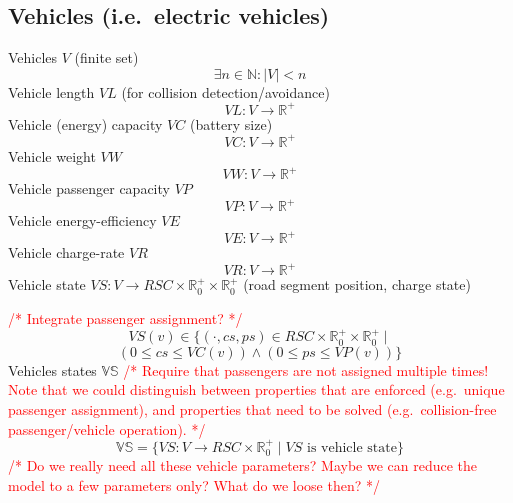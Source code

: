\documentclass[conference]{IEEEtran}
\newcommand{\todo}[1]{\textcolor{red}{/* #1 */}}
\begin{document}
%	
%	
	\subsection{Vehicles (i.e.\ electric vehicles)}
	\label{vehicles}
	
	Vehicles $V$ (finite set)
	\[
		\exists n \in \mathbb{N} : |V| < n
	\]
	Vehicle length $VL$ (for collision detection/avoidance)
	\[
		VL : V \rightarrow \mathbb{R}^+
	\]
	Vehicle (energy) capacity $VC$ (battery size)
	\[
		VC : V \rightarrow \mathbb{R}^+
	\]
	Vehicle weight $VW$
	\[
		VW : V \rightarrow \mathbb{R}^+
	\]
	Vehicle passenger capacity $VP$
	\[
		VP : V \rightarrow \mathbb{R}^+
	\]
	Vehicle energy-efficiency $VE$ 
		\[
		VE : V \rightarrow \mathbb{R}^+
	\]
	Vehicle charge-rate $VR$ 
		\[
		VR : V \rightarrow \mathbb{R}^+
	\]
	Vehicle state $VS : V \rightarrow RSC \times \mathbb{R}_0^+ \times \mathbb{R}_0^+$ (road segment position, charge state) 
	
	\todo{Integrate passenger assignment?}
	\[
		VS(v) \in \{ (\cdot, cs, ps) \in RSC \times \mathbb{R}_0^+ \times \mathbb{R}_0^+ \mid
	\]
	\[
		(0 \leq cs \leq VC(v)) \wedge (0 \leq ps \leq VP(v)) \}
	\]
	Vehicles states $\mathbb{VS}$ \todo{Require that passengers are not assigned multiple times! Note that we could distinguish between properties that are enforced (e.g.\ unique passenger assignment), and properties that need to be solved (e.g.\ collision-free passenger/vehicle operation).}
	\[
		\mathbb{VS} = \{VS : V \rightarrow RSC \times \mathbb{R}_0^+ \mid VS \text{ is vehicle state}\}
	\]
	\todo{Do we really need all these vehicle parameters? Maybe we can reduce the model to a few parameters only? What do we loose then?}
	
\end{document}
